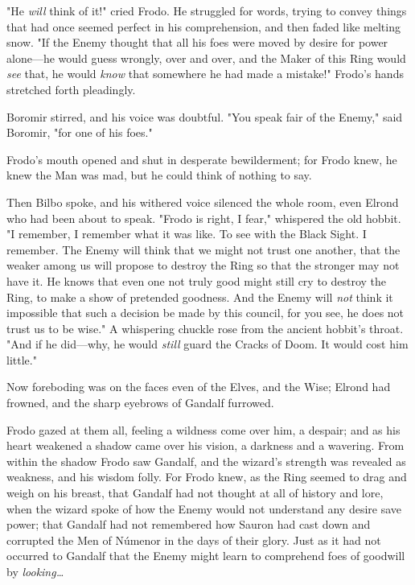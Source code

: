 "He \emph{will} think of it!" cried Frodo. He struggled for words, trying to 
convey things that had once seemed perfect in his comprehension, and then faded 
like melting snow. "If the Enemy thought that all his foes were moved by desire 
for power alone---he would guess wrongly, over and over, and the Maker of this 
Ring would \emph{see} that, he would \emph{know} that somewhere he had made a 
mistake!" Frodo's hands stretched forth pleadingly.

Boromir stirred, and his voice was doubtful. "You speak fair of the Enemy," 
said Boromir, "for one of his foes."

Frodo's mouth opened and shut in desperate bewilderment; for Frodo knew, he 
knew the Man was mad, but he could think of nothing to say.

Then Bilbo spoke, and his withered voice silenced the whole room, even Elrond 
who had been about to speak. "Frodo is right, I fear," whispered the old 
hobbit. "I remember, I remember what it was like. To see with the Black Sight. 
I remember. The Enemy will think that we might not trust one another, that the 
weaker among us will propose to destroy the Ring so that the stronger may not 
have it. He knows that even one not truly good might still cry to destroy the 
Ring, to make a show of pretended goodness. And the Enemy will \emph{not} think 
it impossible that such a decision be made by this council, for you see, he 
does not trust us to be wise." A whispering chuckle rose from the ancient 
hobbit's throat. "And if he did---why, he would \emph{still} guard the Cracks 
of Doom. It would cost him little."

Now foreboding was on the faces even of the Elves, and the Wise; Elrond had 
frowned, and the sharp eyebrows of Gandalf furrowed.

Frodo gazed at them all, feeling a wildness come over him, a despair; and as 
his heart weakened a shadow came over his vision, a darkness and a wavering. 
From within the shadow Frodo saw Gandalf, and the wizard's strength was 
revealed as weakness, and his wisdom folly. For Frodo knew, as the Ring seemed 
to drag and weigh on his breast, that Gandalf had not thought at all of history 
and lore, when the wizard spoke of how the Enemy would not understand any 
desire save power; that Gandalf had not remembered how Sauron had cast down and 
corrupted the Men of Númenor in the days of their glory. Just as it had not 
occurred to Gandalf that the Enemy might learn to comprehend foes of goodwill 
by \emph{looking{\ldots}}

